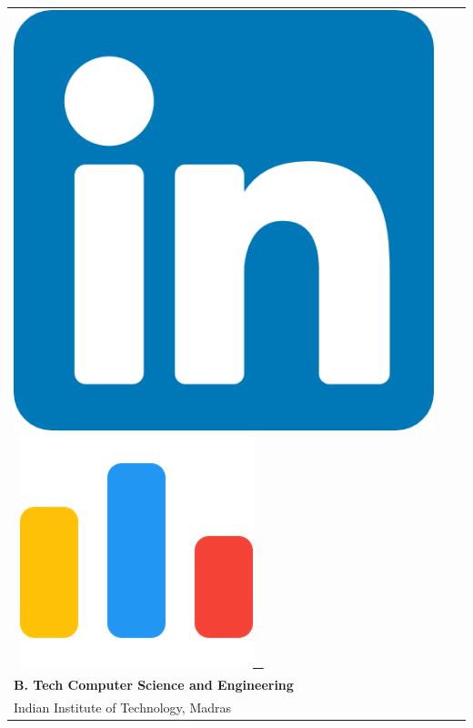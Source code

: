 \documentclass[10pt,article]{article}
\begin{document}
\begin{table}
\begin{minipage}{0.9\linewidth}
\begin{tabular}{l l r}
{{ \href{https://www.linkedin.com/in/snehadeep-gayen/}{\includegraphics[scale=0.05]{linkedin.png}} \ \href{https://codeforces.com/profile/Snehadeep}{\includegraphics[scale=0.06]{cf.png} \ } 
            }}
            \\
            \textbf{B. Tech Computer Science and Engineering} 
            \\
            {Indian Institute of Technology, Madras} 
            \\
        \end{tabular}
    \end{minipage}\hfill
\end{table}
\end{document}
